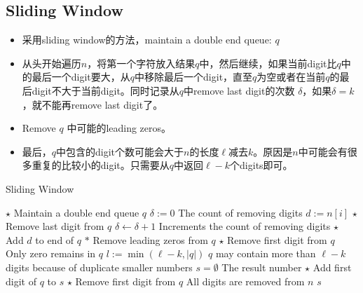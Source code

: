 \subsection{Sliding Window}
\begin{itemize}
\item 采用sliding window的方法，maintain a double end queue: $q$
\item 从头开始遍历$ n $，将第一个字符放入结果$q$中，然后继续，如果当前digit比$q$中的最后一个digit要大，从$q$中移除最后一个digit，直至$q$为空或者在当前$q$的最后digit不大于当前digit。同时记录从$q$中remove last digit的次数 $\delta$，如果$\delta=k$，就不能再remove last digit了。
\item Remove $q$ 中可能的leading zeros。
\item 最后，$q$中包含的digit个数可能会大于$n$的长度$\ell$减去$k$。原因是$n$中可能会有很多重复的比较小的digit。只需要从$q$中返回$\ell-k$个digits即可。
\end{itemize}

\setcounter{algorithm}{0}
\begin{algorithm}[H]
\caption{Sliding Window}
\begin{algorithmic}[1]
\State $\star$ Maintain a double end queue $q$
\State $\delta:=0$ \Comment The count of removing digits
\State $d:=n[i]$
\State $\star$ Remove last digit from $q$
\State $\delta\gets\delta+1$ \Comment Increments the count of removing digits
\EndWhile
\State $\star$ Add $d$ to end of $q$
\EndFor
\State $\ast$ Remove leading zeros from $q$
\State $\star$ Remove first digit from $q$
\EndWhile
{}
\State {} \Comment Only zero remains in $q$
\EndIf
\State $l:=\min(\ell-k, \lvert q\rvert)$ \Comment $q$ may contain more than $\ell-k$ digits because of duplicate smaller numbers
\State $s=\emptyset$ \Comment The result number
\State $\star$ Add first digit of $q$ to $s$
\State $\star$ Remove first digit from $q$
\EndFor
{}
\State {} \Comment All digits are removed from $n$
\Else
\State \Return $s$
\EndIf
{}
\end{algorithmic}
\end{algorithm}
\begin{algorithm}[H]
\begin{algorithmic}[1]
\EndProcedure
\end{algorithmic}
\end{algorithm}

